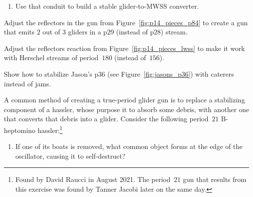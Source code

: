 \begin{multicols}{2}
\begin{problem}
\begin{enumerate}[label=\bf\color{ocre}(\alph*)]
			\item Use that conduit to build a stable glider-to-MWSS converter.
		\end{enumerate}
	\end{problem}
	
	
	\mfilbreak
	
	
	\begin{problem}\label{exer:p28_adjust_29} 
		Adjust the reflectors in the gun from Figure~\ref{fig:p14_pieces_p84} to create a gun that emits $2$ out of $3$ gliders in a p$29$ (instead of p$28$) stream.
	\end{problem}
	
	
	\mfilbreak
	
	
	\begin{problem}\label{exer:p156_adjust_lwss} 
		Adjust the reflectors reaction from Figure~\ref{fig:p14_pieces_lwss} to make it work with Herschel streams of period~$180$ (instead of~$156$).
	\end{problem}
	
	
	\mfilbreak
	
	
	\begin{problem}\label{exer:jasons_p36_caterer} 
		Show how to stabilize Jason's p$36$ (see Figure~\ref{fig:jasons_p36}) with caterers instead of jams.
	\end{problem}
	
	
	\mfilbreak
	
	
	\begin{problemstar}\label{exer:p21_glider_gun}
		A common method of creating a true-period glider gun is to replace a stabilizing component of a hassler, whose purpose it to absorb some debris, with another one that converts that debris into a glider. Consider the following period~$21$ B-heptomino hassler:\footnote{Found by David Raucci in August 2021. The period~$21$ gun that results from this exercise was found by Tanner Jacobi later on the same day.}
		\begin{center}
		\end{center}
		
		\begin{enumerate}[label=\bf\color{ocre}(\alph*)]
			\item {} If one of its boats is removed, what common object forms at the edge of the oscillator, causing it to self-destruct?
			

\end{enumerate}
\end{problemstar}
\end{multicols}
